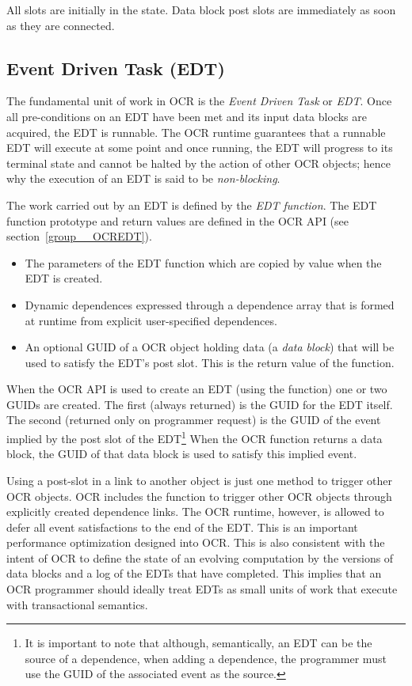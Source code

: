 All slots are initially in the  state. Data
block post slots are immediately  as soon as they are
connected.

\subsection{Event Driven Task (EDT)}
\label{sec:EDT}

The fundamental unit of work in OCR is
the \emph{Event Driven Task} or \emph{EDT}.
Once all pre-conditions on an EDT have been met and its
input data blocks are acquired, the EDT is runnable.  The OCR
runtime guarantees that a runnable EDT will execute at some point and once running,
the EDT will progress to its terminal state
and cannot be halted by the action of other OCR objects; hence why the
execution of an EDT is said to be \emph{non-blocking}.

The work carried out by an EDT is defined by
the \emph{EDT function}. The EDT function prototype
and return values are defined in the OCR API (see section~\ref{group__OCREDT}).
\begin{itemize}
\item The parameters of the EDT function which are copied by value
when the EDT is created.
\item Dynamic dependences expressed through a dependence array that is
formed at runtime from explicit user-specified dependences.
\item An optional GUID of a OCR object holding data (a \emph{data
block}) that will be used to satisfy the EDT’s post slot. This is the
return value of the function.
\end{itemize}

When the OCR API is used to create an EDT (using the  function)
one or two GUIDs are created.  The first (always returned) is the GUID for the EDT itself.
The second (returned only on programmer request) is the GUID of the
event implied by the post slot of the EDT\footnote{It is important to
note that although, semantically, an EDT can be the source of a
dependence, when adding a dependence, the programmer must use the
GUID of the associated event as the source.}
When the OCR function returns a data block, the GUID of
that data block is used to satisfy this implied event.

Using a post-slot in a link to another object is just one method to
trigger other OCR objects. OCR includes the 
function to trigger other OCR objects through explicitly created dependence
links.  The OCR runtime, however, is allowed to defer all event satisfactions
to the end of the EDT.  This is an important performance optimization designed
into OCR.   This is also consistent with the intent of OCR to define the state
of an evolving computation by the versions of data blocks and a log of the
EDTs that have completed.   This implies that an OCR programmer should
ideally treat EDTs as small units of work that execute with transactional
semantics.

